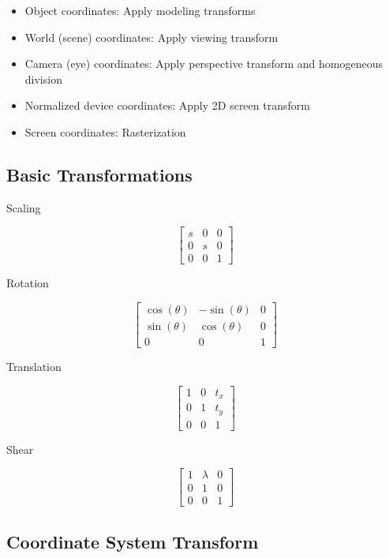 \documentclass[10pt,landscape]{article}
\begin{document}
\begin{multicols}{3}
\begin{itemize}[nosep]
    \item Object coordinates: Apply modeling transforms
    \item World (scene) coordinates: Apply viewing transform
    \item Camera (eye) coordinates: Apply perspective transform and homogeneous division
    \item Normalized device coordinates: Apply 2D screen transform
    \item Screen coordinates: Rasterization
\end{itemize}

\subsection{Basic Transformations}

\begin{multicols}{2}

Scaling

$$\begin{bmatrix}
s & 0 & 0 \\
0 & s & 0 \\
0 & 0 & 1
\end{bmatrix}$$

Rotation

$$\begin{bmatrix}
\cos(\theta) & -\sin(\theta) & 0 \\
\sin(\theta) & \cos(\theta) & 0 \\
0 & 0 & 1
\end{bmatrix}$$

\columnbreak

Translation

$$\begin{bmatrix}
1 & 0 & t_x \\
0 & 1 & t_y \\
0 & 0 & 1
\end{bmatrix}$$

Shear

$$\begin{bmatrix}
1 & \lambda & 0 \\
0 & 1 & 0 \\
0 & 0 & 1
\end{bmatrix}$$

\end{multicols}

\subsection{Coordinate System Transform}


\end{multicols}
\end{document}
